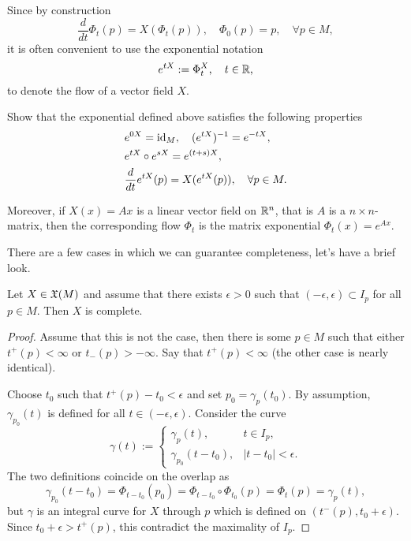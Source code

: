 \begin{notation}
  Since by construction
  \begin{equation}
    \frac{d}{d t}\Phi_t(p) = X(\Phi_t(p)), \quad
    \Phi_0(p) = p, \quad \forall p\in M,
  \end{equation}
  it is often convenient to use the exponential notation
  \begin{equation}
    e^{t X} := \Phi^X_t, \quad t\in\mathbb{R},
  \end{equation}
  to denote the flow of a vector field $X$.
\end{notation}

\begin{exercise}
  Show that the exponential defined above satisfies the following properties
  \begin{align}
    &e^{0X} = \operatorname{id}_M, \quad (e^{tX})^{-1} = e^{-tX}, \\
    &e^{t X}\circ e^{s X}= e^{(t+s)X},\\
    &\frac{d}{d t} e^{tX} (p) = X(e^{tX}(p)), \quad \forall p\in M.
  \end{align}

  Moreover, if $X(x) = Ax$ is a linear vector field on $\mathbb{R}^n$, that is $A$ is a $n\times n$-matrix, then the corresponding flow $\Phi_t$ is the matrix exponential $\Phi_t(x) = e^{Ax}$.
\end{exercise}

There are a few cases in which we can guarantee completeness, let's have a brief look.

\begin{lemma}\label{lemma:charactCompleteVF}
  Let $X\in\mathfrak{X}(M)$ and assume that there exists $\epsilon >0$ such that $(-\epsilon, \epsilon)\subset I_p$ for all $p \in M$.
  Then $X$ is complete.
\end{lemma}
\begin{proof}
  Assume that this is not the case, then there is some $p\in M$ such that either $t^+(p) < \infty$ or $t_-(p)>-\infty$.
  Say that $t^+(p) < \infty$ (the other case is nearly identical).
  
  Choose $t_0$ such that $t^+(p) - t_0 < \epsilon$ and set $p_0 = \gamma_p(t_0)$. By assumption, $\gamma_{p_0}(t)$ is defined for all $t\in(-\epsilon, \epsilon)$. Consider the curve
  \begin{equation}
    \gamma(t) := \begin{cases}
      \gamma_p(t), & t\in I_p,\\
      \gamma_{p_0}(t-t_0), & |t-t_0|<\epsilon.
    \end{cases}
  \end{equation}
  The two definitions coincide on the overlap as
  \begin{equation}
    \gamma_{p_0}(t-t_0) = \Phi_{t-t_0}(p_0) = \Phi_{t-t_0}\circ\Phi_{t_0}(p) = \Phi_t(p) = \gamma_p(t),
  \end{equation}
  but $\gamma$ is an integral curve for $X$ through $p$ which is defined on $(t^-(p), t_0+\epsilon)$.
  Since $t_0 + \epsilon > t^+(p)$, this contradict the maximality of $I_p$.
\end{proof}

